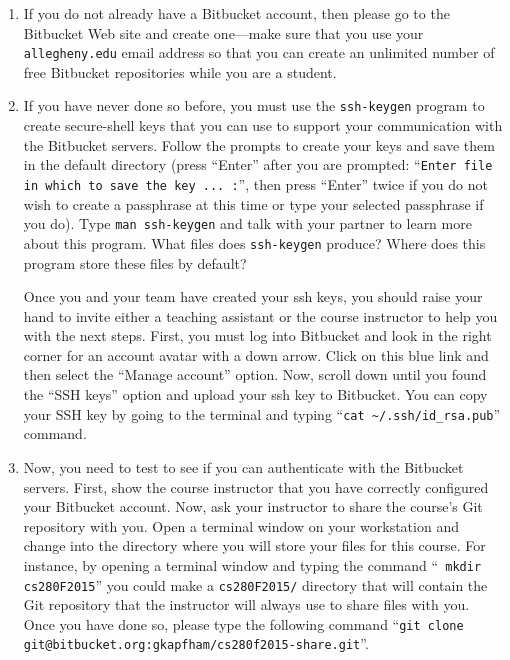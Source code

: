 \begin{enumerate}

  \item If you do not already have a Bitbucket account, then please go to the Bitbucket Web site and create one---make sure
    that you use your {\tt allegheny.edu} email address so that you can create an unlimited number of free Bitbucket
    repositories while you are a student.

  \item If you have never done so before, you must use the {\tt ssh-keygen} program to create secure-shell keys that you
    can use to support your communication with the Bitbucket servers. Follow the prompts to create your keys and save
    them in the default directory (press ``Enter'' after you are prompted: ``{\tt Enter file in which to save the key ...
    :}'', then press ``Enter'' twice if you do not wish to create a passphrase at this time or type your selected
    passphrase if you do).   Type {\tt man ssh-keygen} and talk with your partner to learn more about this program.
    What files does {\tt ssh-keygen} produce?  Where does this program store these files by default?

    Once you and your team have created your ssh keys, you should raise your hand to invite either a teaching
    assistant or the course instructor to help you with the next steps. First, you must log into Bitbucket and look in
    the right corner for an account avatar with a down arrow.  Click on this blue link and then select the ``Manage
    account'' option. Now, scroll down until you found the ``SSH keys'' option and upload your ssh key to Bitbucket. You
    can copy your SSH key by going to the terminal and typing ``{\tt cat \textasciitilde{}/.ssh/id\_rsa.pub}'' command.

  \item Now, you need to test to see if you can authenticate with the Bitbucket servers.  First, show the course
    instructor that you have correctly configured your Bitbucket account.  Now, ask your instructor to share the
    course's Git repository with you.  Open a terminal window on your workstation and change into the directory where
    you will store your files for this course.  For instance, by opening a terminal window and typing the command ``{\tt
    mkdir cs280F2015}'' you could make a {\tt cs280F2015/} directory that will contain the Git repository that the
    instructor will always use to share files with you.  Once you have done so, please type the following command
    ``{\tt git clone git@bitbucket.org:gkapfham/cs280f2015-share.git}''.


\end{enumerate}
